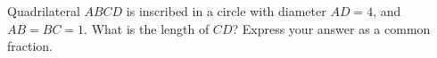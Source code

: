 Quadrilateral $ABCD$ is inscribed in a circle with diameter $AD=4$, and $AB=BC=1$. What is the length of $CD$? Express your answer as a common fraction.
